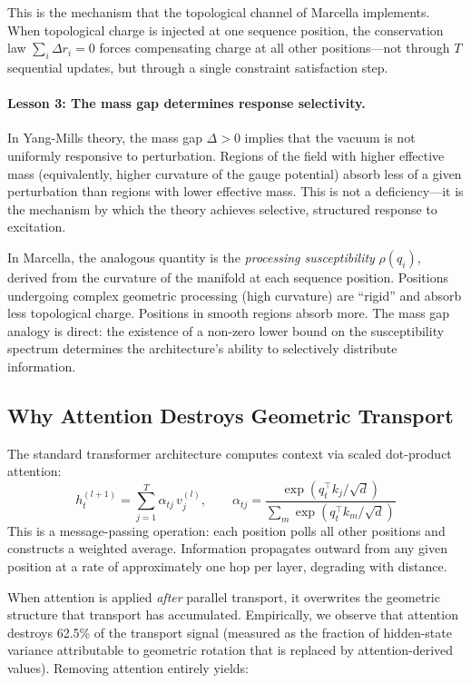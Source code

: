 \documentclass[11pt,a4paper]{article}
\theoremstyle{definition}
\theoremstyle{remark}
\begin{document}
This is the mechanism that the topological channel of Marcella 
implements. When topological charge is injected at one sequence 
position, the conservation law $\sum_i \Delta r_i = 0$ forces 
compensating charge at all other positions---not through $T$ 
sequential updates, but through a single constraint satisfaction 
step.

\paragraph{Lesson 3: The mass gap determines response selectivity.}
In Yang-Mills theory, the mass gap $\Delta > 0$ implies that the 
vacuum is not uniformly responsive to perturbation. Regions of 
the field with higher effective mass (equivalently, higher 
curvature of the gauge potential) absorb less of a given 
perturbation than regions with lower effective mass. This is not 
a deficiency---it is the mechanism by which the theory achieves 
selective, structured response to excitation.

In Marcella, the analogous quantity is the \emph{processing 
susceptibility} $\rho(q_i)$, derived from the curvature of the 
manifold at each sequence position. Positions undergoing complex 
geometric processing (high curvature) are ``rigid'' and absorb 
less topological charge. Positions in smooth regions absorb more. 
The mass gap analogy is direct: the existence of a non-zero lower 
bound on the susceptibility spectrum determines the architecture's 
ability to selectively distribute information.


\subsection{Why Attention Destroys Geometric Transport}
\label{subsec:attention-destructive}

The standard transformer architecture computes context via scaled 
dot-product attention:
\begin{equation}
    h_t^{(l+1)} = \sum_{j=1}^{T} \alpha_{tj} \, v_j^{(l)}, \qquad
    \alpha_{tj} = \frac{\exp(q_t^\top k_j / \sqrt{d})}{\sum_{m} \exp(q_t^\top k_m / \sqrt{d})}
\label{eq:attention-flat}
\end{equation}
This is a message-passing operation: each position polls all other 
positions and constructs a weighted average. Information propagates 
outward from any given position at a rate of approximately one hop 
per layer, degrading with distance.

When attention is applied \emph{after} parallel transport, it 
overwrites the geometric structure that transport has accumulated. 
Empirically, we observe that attention destroys 62.5\% of the 
transport signal (measured as the fraction of hidden-state variance 
attributable to geometric rotation that is replaced by 
attention-derived values). Removing attention entirely yields:
\end{document}
